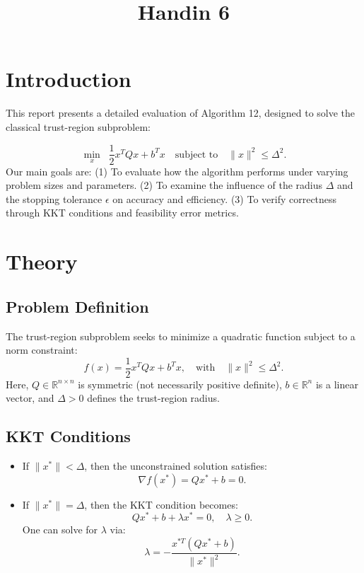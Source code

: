 \documentclass[12pt]{article}
\title{Handin 6}
\begin{document}
\maketitle

\section{Introduction}


This report presents a detailed evaluation of Algorithm 12, designed to solve the classical trust-region subproblem:

\[
\min_{x} \;\; \frac{1}{2} x^T Q x + b^T x \quad \text{subject to} \quad \|x\|^2 \leq \Delta^2.
\]
Our main goals are: (1) To evaluate how the algorithm performs under varying problem sizes and parameters. (2) To examine the influence of the radius $\Delta$ and the stopping tolerance $\epsilon$ on accuracy and efficiency. (3) To verify correctness through KKT conditions and feasibility error metrics.

\section{Theory}


\subsection{Problem Definition}
The trust-region subproblem seeks to minimize a quadratic function subject to a norm constraint:
\[
f(x) = \frac{1}{2} x^T Q x + b^T x, \quad \text{with} \quad \|x\|^2 \leq \Delta^2.
\]
Here, $Q \in \mathbb{R}^{n \times n}$ is symmetric (not necessarily positive definite), $b \in \mathbb{R}^n$ is a linear vector, and $\Delta > 0$ defines the trust-region radius.
\subsection{KKT Conditions}
\begin{itemize}
    \item If $\|x^*\| < \Delta$, then the unconstrained solution satisfies:
    \[
    \nabla f(x^*) = Qx^* + b = 0.
    \]
    
    \item If $\|x^*\| = \Delta$, then the KKT condition becomes:
    \[
    Qx^* + b + \lambda x^* = 0, \quad \lambda \geq 0.
    \]
    One can solve for $\lambda$ via:
    \[
    \lambda = -\frac{x^{*T}(Qx^* + b)}{\|x^*\|^2}.
    \]
\end{itemize}
\end{document}
